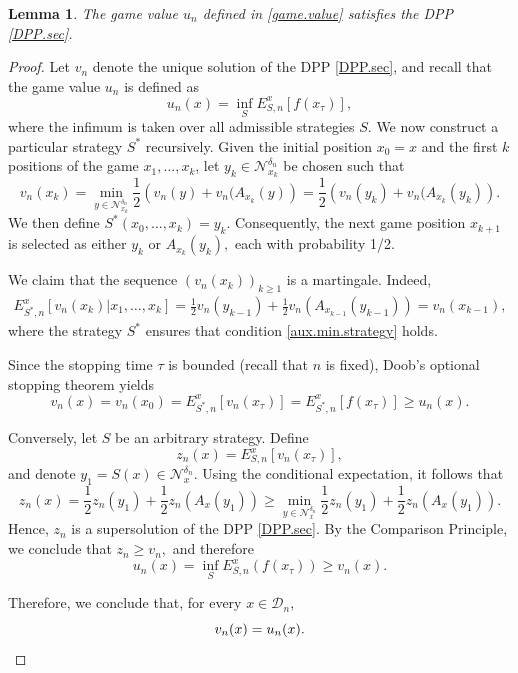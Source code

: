 \documentclass[11pt]{amsart}
\newtheorem{lemma}{Lemma}
\theoremstyle{definition}
\theoremstyle{remark}
\numberwithin{equation}{section}
\newcommand{\Domain}{\mathcal{D}}
\newcommand{\Nc}{{\mathcal N}}
\begin{document}
\begin{lemma}
\label{valor.juego.DPP}
The game value $u_n$ defined in \eqref{game.value} satisfies the DPP \eqref{DPP.sec}.
\end{lemma}
\begin{proof}
Let $v_n$ denote the unique solution of the DPP \eqref{DPP.sec}, and recall that the game value $u_n$ is defined as 
\[
u_n(x)
=
\inf_{S}
E_{S,n}^{x}[f(x_{\tau})],
\]
where the infimum is taken over all admissible strategies $S$.
We now construct a particular strategy $S^*$ recursively.
Given the initial position $x_0=x$ and the first $k$ positions of the game $x_1, \dots, x_k$, let $y_k\in \Nc_{x_k}^{\delta_n}$ be chosen such that
\begin{equation}
\label{aux.min.strategy}
v_n(x_k)
=
\min_{y\in \Nc_{x_k}^{\delta_n}} 
\frac{1}{2} \left( v_n(y) + v_n(A_{x_k}(y) \right) 
=
\frac{1}{2} \left( v_n(y_k) + v_n(A_{x_k}(y_k) \right).
\end{equation}
We then define $S^*(x_0,\dots,x_k)= y_k$.
Consequently, the next game position $x_{k+1}$ is selected as either $y_k$ or $A_{x_k}(y_k),$ each with probability 1/2.

We claim that the sequence $(v_n(x_k))_{k \geq 1}$ is a martingale.
Indeed, 
\begin{align*}
\displaystyle  E_{S^*,n}^x [ v_n(x_k) | x_1,\dots, x_k] 
= 
\frac{1}{2} v_n(y_{k-1})
+
\frac{1}{2} v_n(A_{x_{k-1}}(y_{k-1}))  = v_n(x_{k-1}),
\end{align*}
where the strategy $S^*$ ensures that condition \eqref{aux.min.strategy} holds.

Since the stopping time $\tau$ is bounded (recall that $n$ is fixed), Doob’s optional stopping theorem yields
\[
v_n(x) = v_n(x_0) = E_{S^*,n}^x [v_n(x_{\tau})] = E_{S^*,n}^x [f(x_{\tau})] \geq u_n(x).
\]

Conversely, let $S$ be an arbitrary strategy.
Define 
\[
z_n(x) = E_{S,n}^x [v_n(x_{\tau})]
,
\] 
and denote $y_1 = S(x)\in \Nc_{x}^{\delta_n}$. 
Using the conditional expectation, it follows that
\[
z_n(x) = \frac{1}{2} z_n(y_1) + \frac{1}{2} z_n(A_x(y_1))\geq \min_{y\in \Nc_{x}^{\delta_n}} \frac{1}{2} z_n(y_1) + \frac{1}{2} z_n(A_x(y_1))
.
\]
Hence, $z_n$ is a supersolution of the DPP \eqref{DPP.sec}. 
By the Comparison Principle, we conclude that $z_n\geq v_n,$ and therefore
\[
u_n(x) = \inf_{S} E_{S,n}^x (f(x_{\tau})) \geq v_n (x)
.
\]

Therefore, we conclude that, for every $x \in \Domain_n$,
\[
v_n(x) =  u_n (x). \qedhere
\]
\end{proof}
\end{document}
